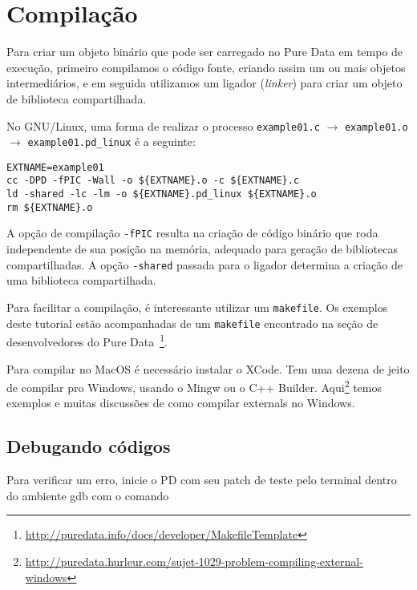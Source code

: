 \section{Compilação}
\label{sec:compiling}

Para criar um objeto binário que pode ser carregado no Pure Data em tempo de
execução, primeiro compilamos o código fonte, criando assim um ou mais objetos
intermediários, e em seguida utilizamos um ligador (\emph{linker}) para criar
um objeto de biblioteca compartilhada.

No GNU/Linux, uma forma de realizar o processo
\texttt{example01.c} $\rightarrow$ \texttt{example01.o} $\rightarrow$
\texttt{example01.pd\_linux} é a seguinte:

\vspace{1em}
\begin{lstlisting}[caption=Compilação de um objeto]
EXTNAME=example01
cc -DPD -fPIC -Wall -o ${EXTNAME}.o -c ${EXTNAME}.c
ld -shared -lc -lm -o ${EXTNAME}.pd_linux ${EXTNAME}.o
rm ${EXTNAME}.o
\end{lstlisting}

A opção de compilação \texttt{-fPIC} resulta na criação de código binário que
roda independente de sua posição na memória, adequado para geração de
bibliotecas compartilhadas. A opção \texttt{-shared} passada para o ligador
determina a criação de uma biblioteca compartilhada.

Para facilitar a compilação, é interessante utilizar um \texttt{makefile}.
Os exemplos deste tutorial estão acompanhadas de um \texttt{makefile} encontrado
na seção de desenvolvedores do Pure
Data~\footnote{\url{http://puredata.info/docs/developer/MakefileTemplate}}.

Para compilar \externals no MacOS é necessário instalar o XCode.
Tem uma dezena de jeito de compilar pro Windows, usando o Mingw ou o C++ Builder.
Aqui\footnote{\url{http://puredata.hurleur.com/sujet-1029-problem-compiling-external-windows}}
temos exemplos e muitas discussões de como compilar externals no Windows.


\subsection{Debugando códigos}

Para verificar um erro, inicie o PD com seu patch de teste pelo terminal dentro do 
ambiente gdb com o comando

